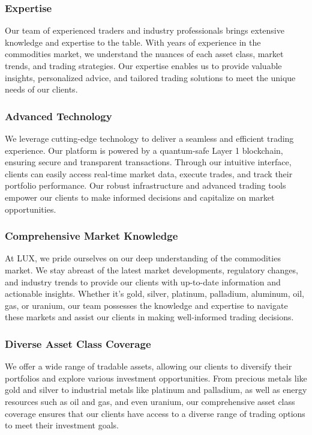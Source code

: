 \documentclass[11pt]{article}
\begin{document}
\subsubsection{Expertise}

Our team of experienced traders and industry professionals brings extensive knowledge and expertise to the table. With years of experience in the commodities market, we understand the nuances of each asset class, market trends, and trading strategies. Our expertise enables us to provide valuable insights, personalized advice, and tailored trading solutions to meet the unique needs of our clients.


\subsubsection{Advanced Technology}

We leverage cutting-edge technology to deliver a seamless and efficient trading experience. Our platform is powered by a quantum-safe Layer 1 blockchain, ensuring secure and transparent transactions. Through our intuitive interface, clients can easily access real-time market data, execute trades, and track their portfolio performance. Our robust infrastructure and advanced trading tools empower our clients to make informed decisions and capitalize on market opportunities.


\subsubsection{Comprehensive Market Knowledge}

At LUX, we pride ourselves on our deep understanding of the commodities market. We stay abreast of the latest market developments, regulatory changes, and industry trends to provide our clients with up-to-date information and actionable insights. Whether it's gold, silver, platinum, palladium, aluminum, oil, gas, or uranium, our team possesses the knowledge and expertise to navigate these markets and assist our clients in making well-informed trading decisions.


\subsubsection{Diverse Asset Class Coverage}

We offer a wide range of tradable assets, allowing our clients to diversify their portfolios and explore various investment opportunities. From precious metals like gold and silver to industrial metals like platinum and palladium, as well as energy resources such as oil and gas, and even uranium, our comprehensive asset class coverage ensures that our clients have access to a diverse range of trading options to meet their investment goals.
\end{document}

